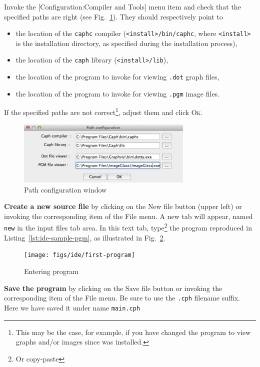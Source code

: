 \medskip
Invoke the [\textsf{Configuration:Compiler and Tools}] menu item and check that the specified paths
are right (see Fig.~\ref{fig:config-window}). They should respectively point to 
\begin{itemize}
\item the location of the \texttt{caphc} compiler (\verb|<install>/bin/caphc|, where
  \verb|<install>| is the \caph installation directory, as specified during the installation
  process),
\item the location of the \texttt{caph} library (\verb|<install>/lib|),
\item the location of the program to invoke for viewing \verb|.dot| graph files, 
\item the location of the program to invoke for viewing \verb|.pgm| image files. 
\end{itemize}
If the specified paths are not correct\footnote{This may be the case, for example, if you have
  changed the program to view graphs and/or images since \caph was installed.}, adjust them and click \textsc{Ok}.

\begin{figure}[h]
  \centering
  \includegraphics[width=0.75\textwidth]{figs/ide/config}
  \caption{Path configuration window}
  \label{fig:config-window}
\end{figure}

\medskip \textbf{Create a new source file} by clicking on the \textsf{New file} button (upper left)
or invoking the corresponding item of the \textsf{File} menu. A new tab will appear, named
\texttt{new} in the input files tab area. In this text tab, type\footnote{Or copy-paste} the program
reproduced in Listing~\ref{lst:ide-sample-pgm}, as illustrated in Fig.~\ref{fig:first-program}. 

\begin{figure}[h]
  \centering
  \texttt{[image: figs/ide/first-program]}
  \caption{Entering program}
  \label{fig:first-program}
\end{figure}

\medskip
\textbf{Save the program} by clicking on the \textsf{Save file} button or invoking the corresponding item of
the \textsf{File} menu. Be sure to use the \verb|.cph| filename suffix. Here we have saved it under
name \verb|main.cph|

